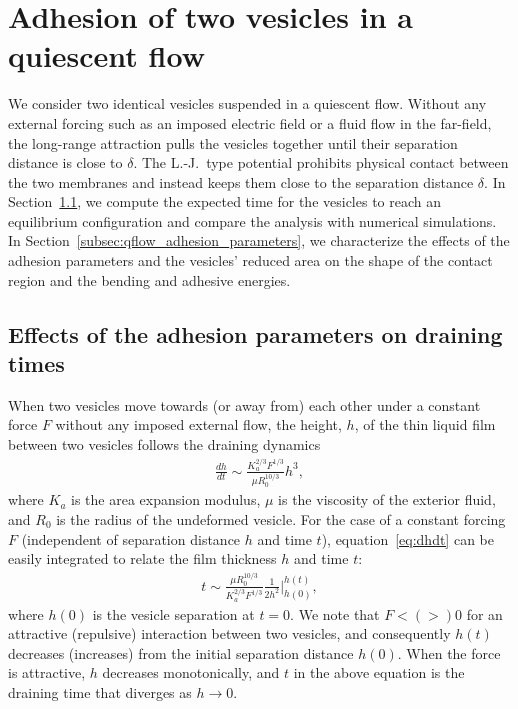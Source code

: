 \documentclass[prf,superscriptaddress,showkeys,longbibliography]{revtex4-1}
\begin{document}


\section{Adhesion of two vesicles in a quiescent flow} 
\label{sec:qflow} 
We consider two identical vesicles suspended in a quiescent flow.
Without any external forcing such as an imposed electric field or a
fluid flow in the far-field, the long-range attraction pulls the
vesicles together until their separation distance is close to $\delta$.
The L.-J.~type potential prohibits physical contact between the two
membranes and instead keeps them close to the separation distance
$\delta$.  In Section~\ref{subsec:qflow_draining_times}, we compute the
expected time for the vesicles to reach an equilibrium configuration and
compare the analysis with numerical simulations.  In
Section~\ref{subsec:qflow_adhesion_parameters}, we characterize the
effects of the adhesion parameters and the vesicles' reduced area on the
shape of the contact region and the bending and adhesive energies.

\subsection{Effects of the adhesion parameters on draining times}
\label{subsec:qflow_draining_times}
When two vesicles move towards (or away from) each other under a
constant force $F$ without any imposed external flow, the height, $h$,
of the thin liquid film between two vesicles follows the draining
dynamics~\cite{RamachandranLeal2010_PoF}
\begin{align}
  \label{eq:dhdt}
  \frac{d h}{dt} \sim \frac{K_a^{2/3} F^{1/3}}{\mu R_0^{10/3}} h^3,
\end{align}
where $K_a$ is the area expansion modulus, $\mu$ is the viscosity of the
exterior fluid, and $R_0$ is the radius of the undeformed vesicle.  For
the case of a constant forcing $F$ (independent of separation distance
$h$ and time $t$), equation~\eqref{eq:dhdt} can be easily integrated to
relate the film thickness $h$ and time $t$:
\begin{align*}
  t \sim \frac{\mu R_0^{10/3}}{K_a^{2/3} F^{1/3}}
    \frac{1}{2 h^2} \bigg|^{h(t)}_{h(0)},
\end{align*}
where $h(0)$ is the vesicle separation at $t=0$.  We note that $F< (>)
0$ for an attractive  (repulsive) interaction between two vesicles,  and
consequently $h(t)$ decreases (increases) from  the initial separation
distance $h(0)$.  When the force is attractive, $h$ decreases
monotonically, and $t$ in the above equation is the draining time that
diverges as $h\rightarrow 0$.
\end{document}
